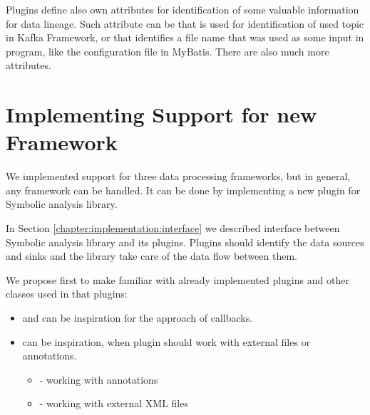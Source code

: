 Plugins define also own attributes for identification of some valuable information
for data lineage.
Such attribute can be  that is used for identification of used
topic in Kafka Framework, or  that identifies a file name that was
used as some input in program, like the configuration file in MyBatis.
There are also much more attributes.




\section{Implementing Support for new Framework}

We implemented support for three data processing frameworks,
but in general, any framework can be handled.
It can be done by implementing a new plugin for Symbolic analysis library.

In Section \ref{chapter:implementation:interface} we described interface between
Symbolic analysis library and its plugins. Plugins should identify the data sources and sinks
and the library take care of the data flow between them.

We propose first to make familiar with already implemented plugins and other
classes used in that plugins:
\begin{itemize}
  \item {} and  can be inspiration for the approach of callbacks.
  \item {} can be inspiration, when plugin should work with external files or annotations.
    \begin{itemize}
      \item {} - working with annotations
      \item {} - working with external XML files
    \end{itemize}
\end{itemize}

